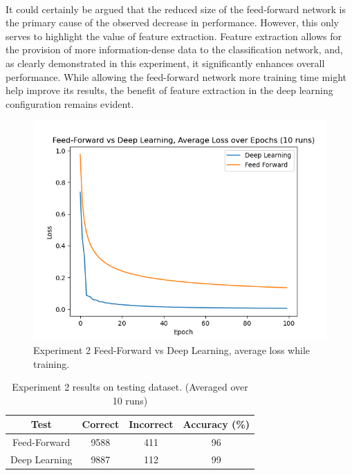 \paragraph{}
It could certainly be argued that the reduced size of the feed-forward network is the primary cause of the observed decrease in performance. However, this only serves to highlight the value of feature extraction. Feature extraction allows for the provision of more information-dense data to the classification network, and, as clearly demonstrated in this experiment, it significantly enhances overall performance. While allowing the feed-forward network more training time might help improve its results, the benefit of feature extraction in the deep learning configuration remains evident.

\begin{center}
	\begin{figure}[H]
		\centering
		\includegraphics[width=\textwidth]{screenshot002}
		\caption{Experiment 2 Feed-Forward vs Deep Learning, average loss while training.}
		\label{fig:ex2loss}
	\end{figure}
\end{center}

\begin{table}[H]
	\centering
	\begin{tabular}{|c|c|c|c|}
		\hline
		Test & Correct & Incorrect & Accuracy (\%) \\
		\hline
		Feed-Forward & 9588 & 411 & 96\\
		\hline
		Deep Learning & 9887 & 112 & 99\\
		\hline
	\end{tabular}
	\caption{Experiment 2 results on testing dataset. (Averaged over 10 runs)}
	\label{tbl:ex2}
\end{table}